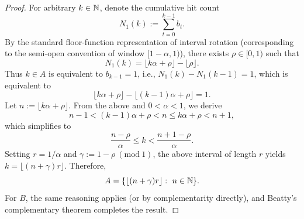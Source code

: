 \begin{proof}
For arbitrary $k\in\mathbb{N}$, denote the cumulative hit count
\[
N_1(k):=\sum_{t=0}^{k-1} b_t.
\]
By the standard floor-function representation of interval rotation (corresponding to the semi-open convention of window $[1-\alpha,1)$), there exists $\rho\in[0,1)$ such that
\[
N_1(k)=\big\lfloor k\alpha+\rho\big\rfloor-\big\lfloor\rho\big\rfloor.
\]
Thus $k\in A$ is equivalent to $b_{k-1}=1$, i.e., $N_1(k)-N_1(k-1)=1$, which is equivalent to
\[
\big\lfloor k\alpha+\rho\big\rfloor-\big\lfloor (k-1)\alpha+\rho\big\rfloor=1.
\]
Let $n:=\lfloor k\alpha+\rho\rfloor$. From the above and $0<\alpha<1$, we derive
\[
n-1< (k-1)\alpha+\rho < n \le k\alpha+\rho < n+1,
\]
which simplifies to
\[
\frac{n-\rho}{\alpha}\le k < \frac{n+1-\rho}{\alpha}.
\]
Setting $r=1/\alpha$ and $\gamma:=1-\rho\ (\mathrm{mod}\ 1)$, the above interval of length $r$ yields $k=\lfloor (n+\gamma)r\rfloor$. Therefore,
\[
A=\{\lfloor (n+\gamma)r\rfloor:\ n\in\NN\}.
\]
For $B$, the same reasoning applies (or by complementarity directly), and Beatty's complementary theorem completes the result.
\end{proof}
